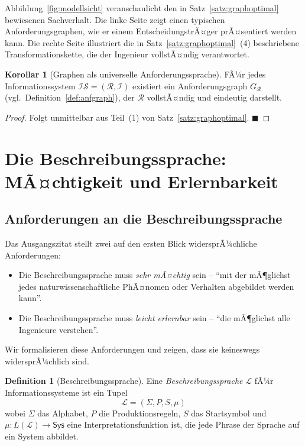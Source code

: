 ﻿\documentclass[a4paper,12pt]{article}
\theoremstyle{definition}
\newtheorem{definition}{Definition}
\newtheorem{korollar}{Korollar}
\begin{document}
Abbildung~\ref{fig:modellsicht} veranschaulicht den in Satz~\ref{satz:graphoptimal}
bewiesenen Sachverhalt. Die linke Seite zeigt einen typischen Anforderungsgraphen,
wie er einem EntscheidungstrÃ¤ger prÃ¤sentiert werden kann. Die rechte Seite
illustriert die in Satz~\ref{satz:graphoptimal}~(4) beschriebene Transformationskette,
die der Ingenieur vollstÃ¤ndig verantwortet.

\begin{korollar}[Graphen als universelle Anforderungssprache]
\label{kor:graphuniv}
FÃ¼r jedes Informationssystem $\mathcal{IS} = (\mathcal{R}, \mathcal{I})$ existiert ein
Anforderungsgraph $G_\mathcal{R}$ (vgl.\ Definition~\ref{def:anfgraph}), der
$\mathcal{R}$ vollstÃ¤ndig und eindeutig darstellt.
\end{korollar}

\begin{proof}
Folgt unmittelbar aus Teil~(1) von Satz~\ref{satz:graphoptimal}. $\blacksquare$
\end{proof}

\section{Die Beschreibungssprache: MÃ¤chtigkeit und Erlernbarkeit}
\label{sec:beschreibungssprache}

\subsection{Anforderungen an die Beschreibungssprache}

Das Ausgangszitat stellt zwei auf den ersten Blick widersprÃ¼chliche Anforderungen:

\begin{itemize}
  \item Die Beschreibungssprache muss \emph{sehr mÃ¤chtig} sein -- \enquote{mit der mÃ¶glichst
        jedes naturwissenschaftliche PhÃ¤nomen oder Verhalten abgebildet werden kann}.
  \item Die Beschreibungssprache muss \emph{leicht erlernbar} sein -- \enquote{die mÃ¶glichst
        alle Ingenieure verstehen}.
\end{itemize}

Wir formalisieren diese Anforderungen und zeigen, dass sie keineswegs widersprÃ¼chlich sind.

\begin{definition}[Beschreibungssprache]
\label{def:beschrsprache}
Eine \emph{Beschreibungssprache} $\mathcal{L}$ fÃ¼r Informationssysteme ist ein Tupel
\[
  \mathcal{L} = (\Sigma, P, S, \mu)
\]
wobei $\Sigma$ das Alphabet, $P$ die Produktionsregeln, $S$ das Startsymbol und
$\mu: L(\mathcal{L}) \to \mathsf{Sys}$ eine Interpretationsfunktion ist, die jede
Phrase der Sprache auf ein System abbildet.
\end{definition}
\end{document}
